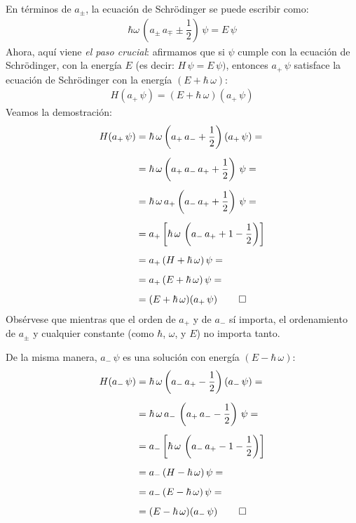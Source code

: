 \documentclass[12pt]{article}
\numberwithin{equation}{section}
\begin{document}
En términos de $a_{\pm}$, la ecuación de Schrödinger se puede escribir como:
\begin{align}
\hbar \omega \, \left( a_{\pm} \, a_{\mp} \pm \dfrac{1}{2} \right) \, \psi = E \, \psi
\label{eq:ecuacion_02_057}
\end{align}
Ahora, aquí viene \emph{el paso crucial}: afirmamos que si $\psi$ cumple con la ecuación de Schrödinger, con la energía $E$ (es decir: $H \, \psi = E \, \psi)$, entonces $a_{+} \, \psi$ satisface la ecuación de Schrödinger con la energía $(E + \hbar \, \omega)$:
\begin{align*}
H (a_{+} \, \psi) = (E + \hbar \, \omega)(a_{+} \, \psi)
\end{align*}
Veamos la demostración:
\begin{align*}
H(a_{+} \, \psi) &= \hbar \, \omega \left( a_{+} \, a_{-} + \dfrac{1}{2} \right) (a_{+} \, \psi) = \\[0.5em]
&= \hbar \, \omega \left( a_{+} \, a_{-} \, a_{+} + \dfrac{1}{2} \right) \, \psi = \\[0.5em]
&= \hbar \, \omega \, a_{+} \left( a_{-} \, a_{+} + \dfrac{1}{2} \right) \, \psi = \\[0.5em]
&= a_{+} \left[ \hbar \, \omega \, \left( a_{-} \, a_{+} + 1 -  \dfrac{1}{2}  \right) \right] \\[0.5em]
&= a_{+} \, (H + \hbar \, \omega) \, \psi = \\[0.5em]
&= a_{+} \, (E + \hbar \, \omega) \, \psi =\\[0.5em]
&= (E + \hbar \, \omega)(a_{+} \, \psi) \, \qed
\end{align*}
Obsérvese que mientras que el orden de $a_{+}$ y de $a_{-}$ sí importa, el ordenamiento de $a_{\pm}$ y cualquier constante (como $\hbar$, $\omega$, y $E$) no importa tanto.
\par
De la misma manera, $a_{-} \, \psi$ es una solución con energía $(E - \hbar \, \omega)$:
\begin{align*}
H(a_{-} \, \psi) &= \hbar \, \omega \left( a_{-} \, a_{+} - \dfrac{1}{2} \right) (a_{-} \, \psi) = \\[0.5em]
&= \hbar \, \omega \, a_{-} \, \left( a_{+} \, a_{-} - \dfrac{1}{2} \right) \, \psi = \\[0.5em]
&= a_{-} \left[ \hbar \, \omega \, \left( a_{-} \, a_{+} - 1 -  \dfrac{1}{2}  \right) \right] \\[0.5em]
&= a_{-} \, (H - \hbar \, \omega) \, \psi = \\[0.5em]
&= a_{-} \, (E - \hbar \, \omega) \, \psi =\\[0.5em]
&= (E - \hbar \, \omega)(a_{-} \, \psi) \, \qed
\end{align*}
\end{document}
